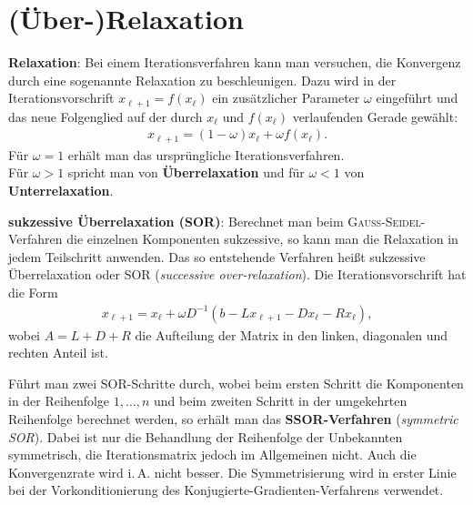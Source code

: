 \section{%
    (Über-)Relaxation%
}

\textbf{Relaxation}:
Bei einem Iterationsverfahren kann man versuchen, die Konvergenz durch
eine sogenannte Relaxation zu beschleunigen.
Dazu wird in der Iterationsvorschrift $x_{\ell+1} = f(x_\ell)$ ein zusätzlicher
Parameter $\omega$ eingeführt und das neue Folgenglied auf der durch
$x_\ell$ und $f(x_\ell)$ verlaufenden Gerade gewählt:
\begin{align*}
    x_{\ell+1} = (1 - \omega)x_\ell + \omega f(x_\ell).
\end{align*}
Für $\omega = 1$ erhält man das ursprüngliche Iterationsverfahren. \\
Für $\omega > 1$ spricht man von \textbf{Überrelaxation} und für $\omega < 1$
von \textbf{Unterrelaxation}.

\linie

\textbf{sukzessive Überrelaxation (SOR)}:
Berechnet man beim \textsc{Gauß}-\textsc{Seidel}-Verfahren die einzelnen
Komponenten sukzessive, so kann man die Relaxation in jedem Teilschritt
anwenden.
Das so entstehende Verfahren heißt sukzessive Überrelaxation oder SOR
(\emph{successive over-relaxation}).
Die Iterationsvorschrift hat die Form
\begin{align*}
    x_{\ell+1}
    = x_\ell + \omega D^{-1}(b - Lx_{\ell+1} - Dx_\ell - Rx_\ell),
\end{align*}
wobei $A = L + D + R$ die Aufteilung der Matrix in den linken, diagonalen
und rechten Anteil ist.

Führt man zwei SOR-Schritte durch, wobei beim ersten Schritt die Komponenten
in der Reihenfolge $1, \dotsc, n$ und beim zweiten Schritt in der umgekehrten
Reihenfolge berechnet werden, so erhält man das
\textbf{SSOR-Verfahren} (\emph{symmetric SOR}).
Dabei ist nur die Behandlung der Reihenfolge der Unbekannten symmetrisch,
die Iterationsmatrix jedoch im Allgemeinen nicht.
Auch die Konvergenzrate wird i.\,A. nicht besser.
Die Symmetrisierung wird in erster Linie bei der Vorkonditionierung des
Konjugierte-Gradienten-Verfahrens verwendet.
